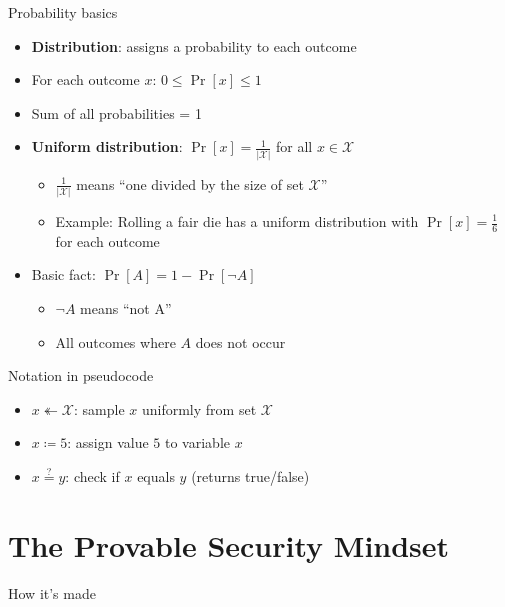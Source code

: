 \ifdefined\PRESENTATION\else\PassOptionsToClass{handout}{beamer}\fi\documentclass[aspectratio=169, lualatex]{beamer}
\begin{document}
\begin{frame}{Probability basics}
	\begin{itemize}[<+->]
		\item \textbf{Distribution}: assigns a probability to each outcome
		\item For each outcome $x$: $0 \leq \Pr[x] \leq 1$
		\item Sum of all probabilities = 1
		\item \textbf{Uniform distribution}: $\Pr[x] = \frac{1}{|\mathcal{X}|}$ for all $x \in \mathcal{X}$
		      \begin{itemize}
			      \item $\frac{1}{|\mathcal{X}|}$ means ``one divided by the size of set $\mathcal{X}$''
			      \item Example: Rolling a fair die has a uniform distribution with $\Pr[x] = \frac{1}{6}$ for each outcome
		      \end{itemize}
		\item Basic fact: $\Pr[A] = 1 - \Pr[\neg A]$
		      \begin{itemize}
			      \item $\neg A$ means ``not A''
			      \item All outcomes where $A$ does not occur
		      \end{itemize}
	\end{itemize}
\end{frame}

\begin{frame}{Notation in pseudocode}
	\begin{itemize}[<+->]
		\item $x \twoheadleftarrow \mathcal{X}$: sample $x$ uniformly from set $\mathcal{X}$
		\item $x \coloneq 5$: assign value $5$ to variable $x$
		\item $x \stackrel{?}{=} y$: check if $x$ equals $y$ (returns true/false)
	\end{itemize}
\end{frame}

\section{The Provable Security Mindset}

\begin{frame}{How it's made}
\end{frame}
\end{document}
